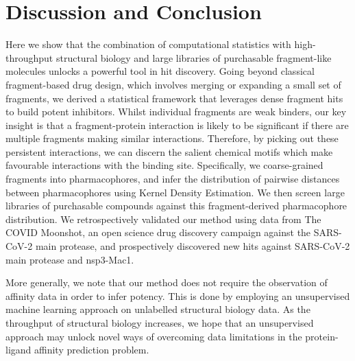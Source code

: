 \section{Discussion and Conclusion} \label{sec:discussion}
Here we show that the combination of computational statistics with high-throughput structural biology and large libraries of purchasable fragment-like molecules unlocks a powerful tool in hit discovery. Going beyond classical fragment-based drug design, which involves merging or expanding a small set of fragments, we derived a statistical framework that leverages dense fragment hits to build potent inhibitors. Whilst individual fragments are weak binders, our key insight is that a fragment-protein interaction is likely to be significant if there are multiple fragments making similar interactions. Therefore, by picking out these persistent interactions, we can discern the salient chemical motifs which make favourable interactions with the binding site. Specifically, we coarse-grained fragments into pharmacophores, and infer the distribution of pairwise distances between pharmacophores using Kernel Density Estimation. We then screen large libraries of purchasable compounds against this fragment-derived pharmacophore distribution. We retrospectively validated our method using data from The COVID Moonshot, an open science drug discovery campaign against the SARS-CoV-2 main protease, and prospectively discovered new hits against SARS-CoV-2 main protease and nsp3-Mac1.



More generally, we note that our method does not require the observation of affinity data in order to infer potency. This is done by employing an unsupervised machine learning approach on unlabelled structural biology data. As the throughput of structural biology increases, we hope that an unsupervised approach may unlock novel ways of overcoming data limitations in the protein-ligand affinity prediction problem.

